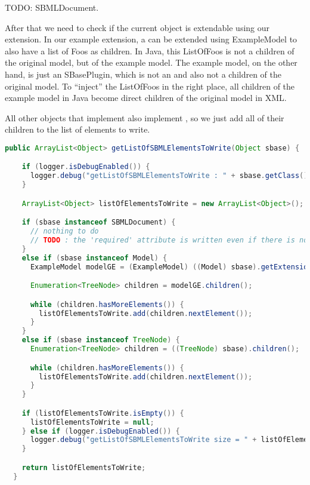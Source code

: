 TODO: SBMLDocument.

After that we need to check if the current object is extendable using our extension.
In our example extension, a \Model{} can be extended using ExampleModel to also
have a list of Foos as children.
In Java, this ListOfFoos is not a children of the original model, but of the
example model.
The example model, on the other hand, is just an SBasePlugin, which is not an
\SBase{} and also not a children of the original model.
To ``inject'' the ListOfFoos in the right place, all children of the example
model in Java become direct children of the original model in XML.

All other objects that implement \SBase{} also implement \TreeNode, so we just add
all of their children to the list of elements to write.

\begin{lstlisting}[language=Java,caption={Extension parser: \texttt{getListOfSBMLElementsToWrite()}},label={lst:ModelExtParserListSBMLToWrite}]
  public ArrayList<Object> getListOfSBMLElementsToWrite(Object sbase) {

    if (logger.isDebugEnabled()) {
      logger.debug("getListOfSBMLElementsToWrite : " + sbase.getClass().getCanonicalName());
    }

    ArrayList<Object> listOfElementsToWrite = new ArrayList<Object>();

    if (sbase instanceof SBMLDocument) {
      // nothing to do
      // TODO : the 'required' attribute is written even if there is no plugin class for the SBMLDocument, so I am not totally sure how this is done.
    }
    else if (sbase instanceof Model) {
      ExampleModel modelGE = (ExampleModel) ((Model) sbase).getExtension(ExampleConstant.namespaceURI);

      Enumeration<TreeNode> children = modelGE.children();

      while (children.hasMoreElements()) {
        listOfElementsToWrite.add(children.nextElement());
      }
    }
    else if (sbase instanceof TreeNode) {
      Enumeration<TreeNode> children = ((TreeNode) sbase).children();

      while (children.hasMoreElements()) {
        listOfElementsToWrite.add(children.nextElement());
      }
    }

    if (listOfElementsToWrite.isEmpty()) {
      listOfElementsToWrite = null;
    } else if (logger.isDebugEnabled()) {
      logger.debug("getListOfSBMLElementsToWrite size = " + listOfElementsToWrite.size());
    }

    return listOfElementsToWrite;
  }
\end{lstlisting}

